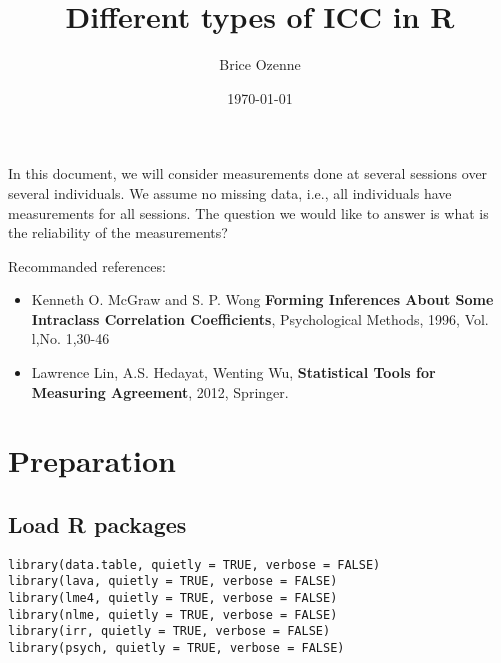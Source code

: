 \documentclass{article}
\author{Brice Ozenne}
\date{\today}
\title{Different types of ICC in R}
\begin{document}
\maketitle
\tableofcontents

\bigskip
\bigskip

In this document, we will consider measurements done at several
sessions over several individuals. We assume no missing data, i.e.,
all individuals have measurements for all sessions. The question we
would like to answer is what is the reliability of the measurements?

\bigskip

Recommanded references: 
\begin{itemize}
\item Kenneth O. McGraw and S. P. Wong \textbf{Forming Inferences About Some Intraclass Correlation Coefficients}, Psychological Methods, 1996, Vol. l,No. 1,30-46
\item Lawrence Lin, A.S. Hedayat, Wenting Wu, \textbf{Statistical Tools for Measuring Agreement}, 2012, Springer.
\end{itemize}
\clearpage

\section{Preparation}
\label{sec:org26476cb}

\subsection{Load R packages}
\label{sec:orgd6bd315}
\lstset{language=r,label= ,caption= ,captionpos=b,numbers=none}
\begin{lstlisting}
library(data.table, quietly = TRUE, verbose = FALSE)
library(lava, quietly = TRUE, verbose = FALSE)
library(lme4, quietly = TRUE, verbose = FALSE)
library(nlme, quietly = TRUE, verbose = FALSE)
library(irr, quietly = TRUE, verbose = FALSE)
library(psych, quietly = TRUE, verbose = FALSE)
\end{lstlisting}
\end{document}

